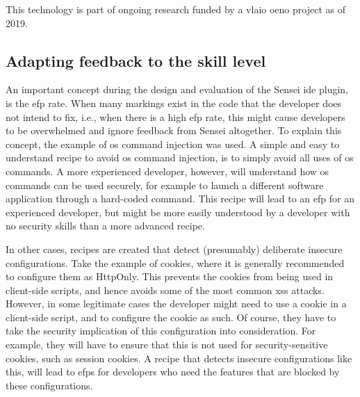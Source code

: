 This technology is part of ongoing research funded by a \gls{vlaio} \gls{oeno} project as of 2019.

\subsection{Adapting feedback to the skill level}
An important concept during the design and evaluation of the Sensei \gls{ide} plugin, is the \gls{efp} rate.
When many markings exist in the code that the developer does not intend to fix, i.e., when there is a high \gls{efp} rate, this might cause developers to be overwhelmed and ignore feedback from Sensei altogether.
To explain this concept, the example of \gls{os} command injection was used.
A simple and easy to understand recipe to avoid \gls{os} command injection, is to simply avoid all uses of \gls{os} commands.
A more experienced developer, however, will understand how \gls{os} commands can be used securely, for example to launch a different software application through a hard-coded command.
This recipe will lead to an \gls{efp} for an experienced developer, but might be more easily understood by a developer with no security skills than a more advanced recipe.

In other cases, recipes are created that detect (presumably) deliberate insecure configurations.
Take the example of cookies, where it is generally recommended to configure them as HttpOnly.
This prevents the cookies from being used in client-side scripts, and hence avoids some of the most common \gls{xss} attacks.
However, in some legitimate cases the developer might need to use a cookie in a client-side script, and to configure the cookie as such.
Of course, they have to take the security implication of this configuration into consideration.
For example, they will have to ensure that this is not used for security-sensitive cookies, such as session cookies.
A recipe that detects insecure configurations like this, will lead to \glspl{efp} for developers who need the features that are blocked by these configurations.

